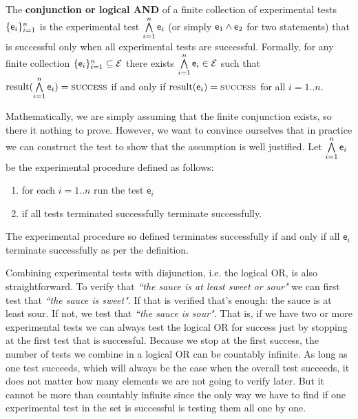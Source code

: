 \documentclass[11pt,letterpaper,fleqn]{memoir} %
\begin{document}
\begin{mathSection}
	\begin{axiom}\label{def_experimental_test_AND}
	The \textbf{conjunction or logical AND} of a finite collection of experimental tests $\{\mathsf{e}_i\}_{i=1}^{n}$ is the experimental test $\bigwedge\limits_{i=1}^{n} \mathsf{e}_i$ (or simply $\mathsf{e}_1 \wedge \mathsf{e}_2$ for two statements) that is successful only when all experimental tests are successful. Formally, for any finite collection $\{\mathsf{e}_i\}_{i=1}^{n} \subseteq \mathcal{E}$ there exists $ \bigwedge\limits_{i=1}^{n} \mathsf{e}_i \in \mathcal{E}$ such that $\operatorname{result}(\bigwedge\limits_{i=1}^{n} \mathsf{e}_i) = \textsc{success}$ if and only if $\operatorname{result}(\mathsf{e}_i) = \textsc{success}$ for all $i=1..n$.
	\end{axiom}
	\begin{justification}
		Mathematically, we are simply assuming that the finite conjunction exists, so there it nothing to prove. However, we want to convince ourselves that in practice we can construct the test to show that the assumption is well justified. Let $\bigwedge\limits_{i=1}^{n} \mathsf{e}_i$ be the experimental procedure defined as follows:
		\begin{enumerate}
			\item for each $i=1..n$ run the test $\mathsf{e}_i$
			\item if all tests terminated successfully terminate successfully.
		\end{enumerate}
		The experimental procedure so defined terminates successfully if and only if all $\mathsf{e}_i$ terminate successfully as per the definition.
	\end{justification}
\end{mathSection}	

Combining experimental tests with disjunction, i.e. the logical OR, is also straightforward. To verify that \emph{``the sauce is at least sweet or sour"} we can first test that \emph{``the sauce is sweet"}. If that is verified that's enough: the sauce is at least sour. If not, we test that \emph{``the sauce is sour"}. That is, if we have two or more experimental tests we can always test the logical OR for success just by stopping at the first test that is successful. Because we stop at the first success, the number of tests we combine in a logical OR can be countably infinite. As long as one test succeeds, which will always be the case when the overall test succeeds, it does not matter how many elements we are not going to verify later. But it cannot be more than countably infinite since the only way we have to find if one experimental test in the set is successful is testing them all one by one.
\end{document}
